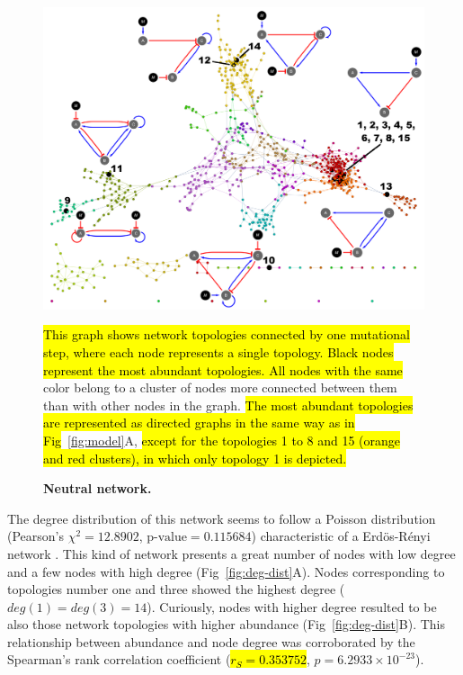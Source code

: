\documentclass[10pt,letterpaper]{article}
\newcommand{\hil}[1]{\hl{#1}} %
\begin{document}
\begin{figure}[!h]
 \includegraphics[width=\textwidth]{figures/results/Fig3}
 \caption{\bf Neutral network.}
 \hil{This graph shows network topologies connected by one mutational step, where
 each node represents a single topology. Black nodes represent the most
 abundant topologies. All nodes with the same}
 color belong to a cluster of nodes more connected between them than with other
 nodes in the graph. \hil{The most abundant topologies are represented as
 directed graphs in the same way as in Fig}~\ref{fig:model}A, \hil{except for
 the topologies 1 to 8 and 15 (orange and red clusters), in which only
 topology 1 is depicted.}
 \label{fig:neutral-network}
\end{figure}

The degree distribution of this network seems to follow a Poisson distribution
(Pearson’s $\chi^2 = 12.8902$, $\text{p-value} = 0.115684$) characteristic of a
Erdös-Rényi network \cite{Erdos1959}. This kind of network presents a great
number of nodes with low degree and a few nodes with high degree
(Fig~\ref{fig:deg-dist}A). Nodes corresponding to topologies number one and
three showed the highest degree ($deg(1) = deg (3) = 14$). Curiously, nodes with
higher degree resulted to be also those network topologies with higher abundance
(Fig~\ref{fig:deg-dist}B). This relationship between abundance and node degree
was corroborated by the Spearman's rank correlation coefficient
(\hil{$r_S = 0.353752$}, $p = 6.2933\times10^{-23} $).
\end{document}
